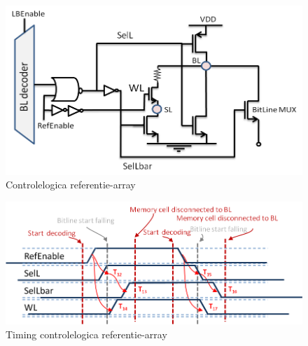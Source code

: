 \begin{figure}[!ht]
  \centering
  \includegraphics[scale=0.6]{../fig/hfdstk-timing-lbref1.png}
  \caption{Controlelogica referentie-array}
  \label{fig:lbref_timing1}
\end{figure}

\begin{figure}[!ht]
  \centering
  \includegraphics[scale=0.9]{../fig/hfdstk-timing-lbref2.png}
  \caption{Timing controlelogica referentie-array}
  \label{fig:lbref_timing2}
\end{figure}

